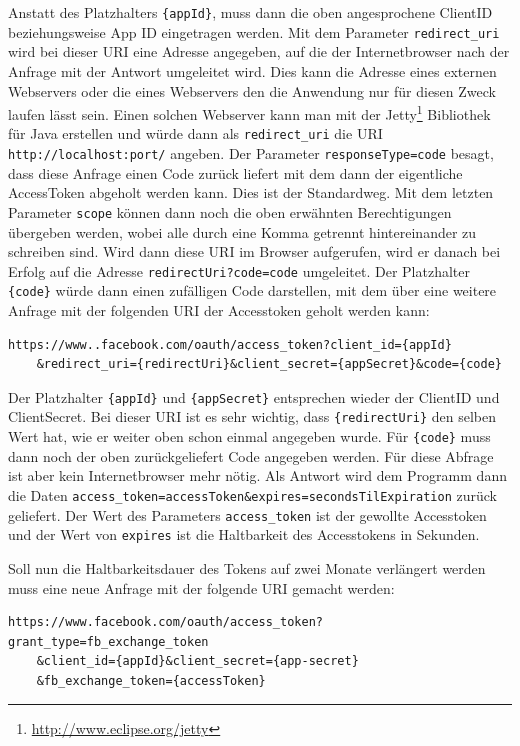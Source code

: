 Anstatt des Platzhalters \texttt{\{appId\}}, muss dann die oben angesprochene ClientID beziehungsweise App ID eingetragen werden. Mit dem Parameter \texttt{redirect\_uri} wird bei dieser URI eine Adresse angegeben, auf die der Internetbrowser nach der Anfrage mit der Antwort umgeleitet wird. Dies kann die Adresse eines externen Webservers oder die eines Webservers den die Anwendung nur für diesen Zweck laufen lässt sein. Einen solchen Webserver kann man mit der Jetty\footnote{\url{http://www.eclipse.org/jetty}} Bibliothek für Java erstellen und würde dann als \texttt{redirect\_uri} die URI \texttt{http://localhost:{port}/} angeben. Der Parameter \texttt{responseType=code} besagt, dass diese Anfrage einen Code zurück liefert mit dem dann der eigentliche AccessToken abgeholt werden kann. Dies ist der Standardweg. Mit dem letzten Parameter \texttt{scope} können dann noch die oben erwähnten Berechtigungen übergeben werden, wobei alle durch eine Komma getrennt hintereinander zu schreiben sind. Wird dann diese URI im Browser aufgerufen, wird er danach bei Erfolg auf die Adresse \texttt{{redirectUri}?code={code}} umgeleitet. Der Platzhalter \texttt{\{code\}} würde dann einen zufälligen Code darstellen, mit dem über eine weitere Anfrage mit der folgenden URI der Accesstoken geholt werden kann:

\begin{lstlisting}[numbers=none, belowskip=-18pt]
https://www..facebook.com/oauth/access_token?client_id={appId}
    &redirect_uri={redirectUri}&client_secret={appSecret}&code={code}
\end{lstlisting}

Der Platzhalter \texttt{\{appId\}} und \texttt{\{appSecret\}} entsprechen wieder der ClientID und ClientSecret. Bei dieser URI ist es sehr wichtig, dass \texttt{\{redirectUri\}} den selben Wert hat, wie er weiter oben schon einmal angegeben wurde. Für \texttt{\{code\}} muss dann noch der oben zurückgeliefert Code angegeben werden. Für diese Abfrage ist aber kein Internetbrowser mehr nötig. Als Antwort wird dem Programm dann die Daten \texttt{access\_token={accessToken}\&expires={secondsTilExpiration}} zurück geliefert. Der Wert des Parameters \texttt{access\_token} ist der gewollte Accesstoken und der Wert von \texttt{expires} ist die Haltbarkeit des Accesstokens in Sekunden.

Soll nun die Haltbarkeitsdauer des Tokens auf zwei Monate verlängert werden muss eine neue Anfrage mit der folgende URI gemacht werden:

\begin{lstlisting}[numbers=none, belowskip=-18pt]
https://www.facebook.com/oauth/access_token?grant_type=fb_exchange_token
    &client_id={appId}&client_secret={app-secret}
    &fb_exchange_token={accessToken}
\end{lstlisting} 

